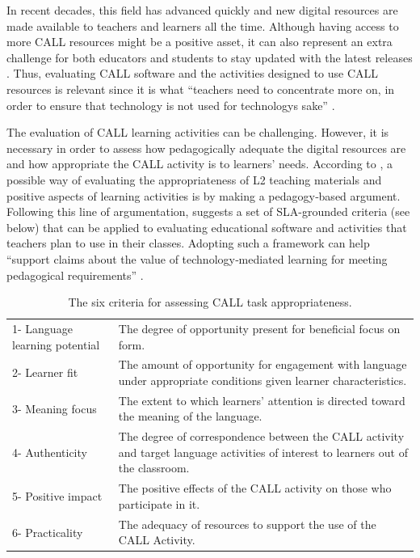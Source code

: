 \documentclass[english]{textolivre}
\begin{document}
In recent decades, this field has advanced quickly
\cite{pennington2019} and new digital resources are made available
to teachers and learners all the time. Although having access to more
CALL resources might be a positive asset, it can also represent an extra
challenge for both educators and students to stay updated with the
latest releases \cite{soleimani2021}. Thus, evaluating CALL software and
the activities designed to use CALL resources is relevant since it is
what ``teachers need to concentrate more on, in order to ensure that
technology is not used for technology\textquotesingle s sake'' \cite[p.~9]{stanley2013}.

The evaluation of CALL learning activities can be challenging. However,
it is necessary in order to assess how pedagogically adequate the
digital resources are and how appropriate the CALL activity is to
learners' needs. According to \textcite{chapelle2017}, a possible way of
evaluating the appropriateness of L2 teaching materials and positive
aspects of learning activities is by making a pedagogy‐based argument.
Following this line of argumentation, \textcite{chapelle2001} suggests a set of
SLA-grounded criteria (see  below) that can be applied to
evaluating educational software and activities that teachers plan to use
in their classes. Adopting such a framework can help ``support claims
about the value of technology‐mediated learning for meeting pedagogical
requirements'' \cite[p.~386]{chapelle2017}.


\begin{table}[htpb]
\centering
\begin{threeparttable}
\caption{The six criteria for assessing CALL task appropriateness.}
\label{tbl02}
\begin{tabular}{lp{11cm}}
\toprule
\multicolumn{1}{p{3cm}}{1- Language learning potential} & The degree of opportunity present for
beneficial focus on form. \\
2- Learner fit & The amount of opportunity for engagement with language
under appropriate conditions given learner characteristics. \\
3- Meaning focus & The extent to which learners' attention is directed
toward the meaning of the language. \\
4- Authenticity & The degree of correspondence between the CALL activity
and target language activities of interest to learners out of the
classroom. \\
5- Positive impact & The positive effects of the CALL activity on those
who participate in it. \\
6- Practicality & The adequacy of resources to support the use of the
CALL Activity. \\
\bottomrule
\end{tabular}
\end{threeparttable}
\end{table}
\end{document}

